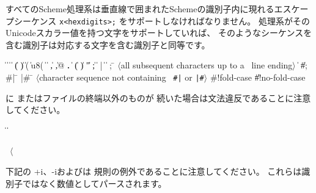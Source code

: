 すべてのScheme処理系は垂直線で囲まれたSchemeの識別子内に現れるエスケープシーケンス %
{\tt \backwhack{}x<hexdigits>;} をサポートしなければなりません。
処理系がそのUnicodeスカラー値を持つ文字をサポートしていれば、
そのようなシーケンスを含む識別子は対応する文字を含む識別子と同等です。

\begin{grammar}%
 \:  \|  \| 
\>  \|  \| 
\>  \| ( \| ) \| \sharpsign( \| \sharpsign u8( \| \singlequote{} \| \backquote{} \| , \| ,@ \| {\bf.}
 \:  \| 
\> \| ( \| ) \| " \| ;
 \: 
 \:  \| 
 \: |
 \:  \|  
\> \| 
 \: ; \= $\langle$\rm all subsequent characters up to a
		    \>\ \rm line ending$\rangle$
\> \| 
\> \| \#;  
 \: \#| \= 
\>  |\#
 \: \= $\langle$\rm character sequence not containing
\>\ \rm {\tt \#|} or {\tt |\#}$\rangle$
 \:  
 \: \#!fold-case \| \#!no-fold-case%
\end{grammar}

に
またはファイルの終端以外のものが
続いた場合は文法違反であることに注意してください。

\begin{grammar}%
 \:  \|  \| 
 \: %
\end{grammar}

\label{extendedalphas}
\label{identifiersyntax}

\hbox{\cf{} \goesto{} $\langle$}

下記の {\cf +i}、{\cf -i}およびは
規則の例外であることに注意してください。
これらは識別子ではなく数値としてパースされます。

